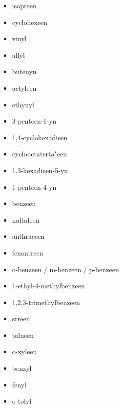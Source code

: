 \documentclass[a4paper,12pt]{article}
\begin{document}
\begin{enumerate}
\begin{itemize}
                \item isopreen
                \item cyclohexeen
                \item vinyl
                \item allyl
                \item butenyn
                \item actyleen
                \item ethynyl
                \item 3-penteen-1-yn                                                                                                                                                   
                \item 1,4-cyclohexadieen
                \item cyclooctaterta"een
                \item 1,3-hexadieen-5-yn
                \item 1-penteen-4-yn
                \item benzeen
                \item naftaleen
                \item anthraceen
                \item fenantreen
                \item o-benzeen / m-benzeen / p-benzeen
                \item 1-ethyl-4-methylbenzeen
                \item 1,2,3-trimethylbenzeen
                \item streen
                \item tolueen
                \item o-xyleen
                \item benzyl
                \item fenyl
                \item o-tolyl
            \end{itemize}

\end{enumerate}
\end{document}
